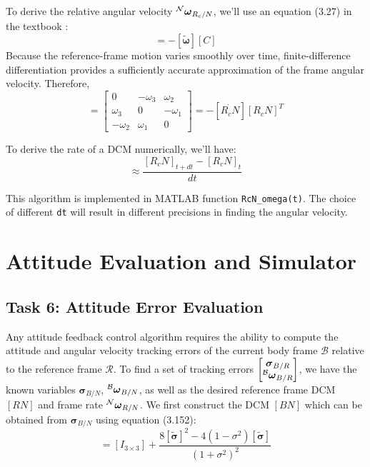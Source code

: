 \documentclass[12pt,a4paper]{report}
\begin{document}
	To derive the relative angular velocity $\prescript{\mathcal{N}}{}{\boldsymbol{\omega}_{R_c/N}}$, we'll use an equation (3.27) in the textbook \cite{textbook} :
	\begin{equation}
		[\dot{C}] = -[\tilde{\boldsymbol{\omega}}][C]
	\end{equation}
	Because the reference-frame motion varies smoothly over time, finite-difference differentiation provides a sufficiently accurate approximation of the frame angular velocity. Therefore,
	\begin{equation}
	[\tilde{\boldsymbol{\omega}}_{R_c/N}] = 
	\begin{bmatrix}
		0 & -\omega_3 & \omega_2 \\
		\omega_3 & 0 & -\omega_1 \\
		-\omega_2 & \omega_1 & 0
	\end{bmatrix} = -[\dot{R_cN}][R_cN]^T\end{equation}
	
	To derive the rate of a DCM numerically, we'll have:
	\begin{equation}[\dot{R_cN}] \approx \frac{[R_cN]_{t+dt} - [R_cN]_{t}}{dt}\end{equation}
	
	This algorithm is implemented in MATLAB function \texttt{RcN\_omega(t)}. The choice of different \texttt{dt} will result in different precisions in finding the angular velocity.	
	
	\section{Attitude Evaluation and Simulator}
	
	\subsection{Task 6: Attitude Error Evaluation}
	
	Any attitude feedback control algorithm requires the ability to compute the attitude and angular velocity tracking errors of the current body frame $\mathcal{B}$ relative to the reference frame $\mathcal{R}$. 
	To find a set of tracking errors $\begin{bmatrix}
		\boldsymbol{\sigma}_{B/R} \\
		\prescript{\mathcal{B}}{}{\boldsymbol{\omega}}_{B/R}
	\end{bmatrix}$, we have the known variables $\boldsymbol{\sigma}_{B/N}$, $\prescript{\mathcal{B}}{}{\boldsymbol{\omega}}_{B/N}$, as well as the desired reference frame DCM $[RN]$ and frame rate $\prescript{\mathcal{N}}{}{\boldsymbol{\omega}}_{R/N}$.
	We first construct the DCM $[BN]$ which can be obtained from $\boldsymbol{\sigma}_{B/N}$ using equation (3.152):
	\begin{equation}[C] = [I_{3\times3}] + \frac{8[\tilde{\boldsymbol{\sigma}}]^2 - 4(1-\sigma^2)[\tilde{\boldsymbol{\sigma}}]}{(1+\sigma^2)^2}\end{equation}
	
\end{document}

